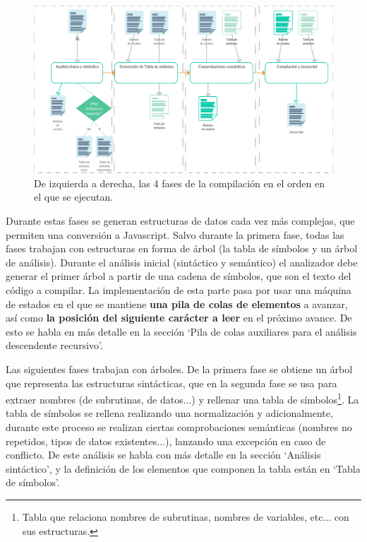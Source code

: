 \documentclass{report}
\begin{document}
		
\begin{figure}
\centering
\includegraphics[width=1\linewidth]{fasesanalisis}
\caption[Fases de compilación.]{De izquierda a derecha, las 4 fases de la compilación en el orden en el que se ejecutan. }
\label{fig:fasesanalisis}
\end{figure}

	
	\vspace{10px}
	
	Durante estas fases se generan estructuras de datos cada vez más complejas, que permiten una conversión a Javascript. Salvo durante la primera fase, todas las fases trabajan con estructuras en forma de árbol (la tabla de símbolos y un árbol de análisis). Durante el análisis inicial (sintáctico y semántico) el analizador debe generar el primer árbol a partir de una cadena de símbolos, que son el texto del código a compilar. La implementación de esta parte pasa por usar una máquina de estados en el que se mantiene \textbf{una pila de colas de elementos} a avanzar, así como \textbf{la posición del siguiente carácter a leer} en el próximo avance. De esto se habla en más detalle en la sección `Pila de colas auxiliares para el análisis descendente recursivo'. 
	
	\vspace{10px}
	
	Las siguientes fases trabajan con árboles. De la primera fase se obtiene un árbol que representa las estructuras sintácticas, que en la segunda fase se usa para extraer nombres (de subrutinas, de datos...) y rellenar una tabla de símbolos\footnote{Tabla que relaciona nombres de subrutinas, nombres de variables, etc... con sus estructuras.}. La tabla de símbolos se rellena realizando una normalización y adicionalmente, durante este proceso se realizan ciertas comprobaciones semánticas (nombres no repetidos, tipos de datos existentes...), lanzando una excepción en caso de conflicto. De este análisis se habla con más detalle en la sección `Análisis sintáctico', y la definición de los elementos que componen la tabla están en `Tabla de símbolos'.
	
\end{document}

